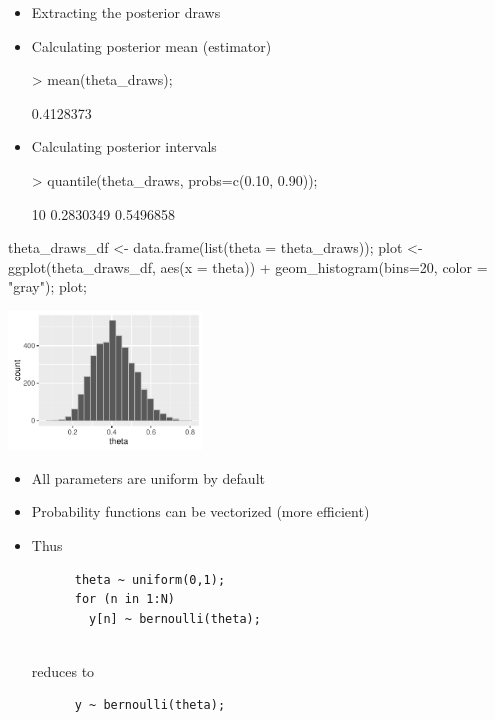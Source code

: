 \documentclass[10pt]{report}
\begin{document}
%
\begin{itemize}
\item Extracting the posterior draws
\item Calculating posterior mean (estimator)
\begin{codein}
> mean(theta_draws);
\end{codein}
\begin{codeout}
[1] 0.4128373
\end{codeout}
\item Calculating posterior intervals
\begin{codein}
> quantile(theta_draws, probs=c(0.10, 0.90));
\end{codein}
\begin{codeout}
      10%
0.2830349 0.5496858
\end{codeout}
\end{itemize}


%
\begin{codein}
theta_draws_df <- data.frame(list(theta = theta_draws));
plot <-
  ggplot(theta_draws_df, aes(x = theta)) +
  geom_histogram(bins=20, color = "gray");
plot;
\end{codein}
\vspace*{-9pt}
\begin{center}
\includegraphics[height=1.45in]{img/bern-posterior-histogram.pdf}
\end{center}


%
\begin{itemize}
\item All parameters are uniform by default
\item Probability functions can be vectorized (more efficient)
\item Thus
{\small
\begin{Verbatim}
      theta ~ uniform(0,1);
      for (n in 1:N)
        y[n] ~ bernoulli(theta);
\end{Verbatim}
}
\mbox{ }
\\
{\normalsize reduces to}
\\
{\small
\begin{Verbatim}
      y ~ bernoulli(theta);
\end{Verbatim}
}
\end{itemize}
\end{document}
